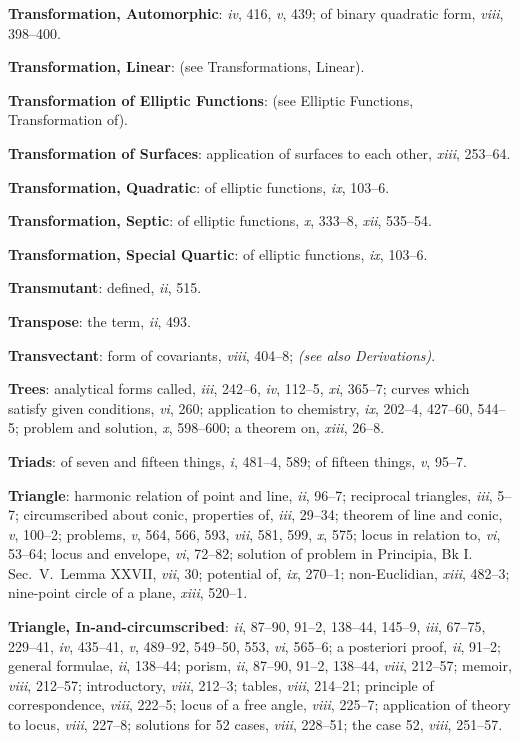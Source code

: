 \documentclass[11pt,a4paper]{article}
\newcommand{\IndexEntry}[1]{\textbf{#1}}
\newcommand{\SeeAlso}[1]{\textit{(see also #1)}}
\newcommand{\V}[1]{\textit{#1}} %
\begin{document}
\IndexEntry{Transformation, Automorphic}: \V{iv}, 416, \V{v}, 439; of binary quadratic form, \V{viii}, 398--400.

\IndexEntry{Transformation, Linear}: (see Transformations, Linear).

\IndexEntry{Transformation of Elliptic Functions}: (see Elliptic Functions, Transformation of).

\IndexEntry{Transformation of Surfaces}: application of surfaces to each other, \V{xiii}, 253--64.

\IndexEntry{Transformation, Quadratic}: of elliptic functions, \V{ix}, 103--6.

\IndexEntry{Transformation, Septic}: of elliptic functions, \V{x}, 333--8, \V{xii}, 535--54.

\IndexEntry{Transformation, Special Quartic}: of elliptic functions, \V{ix}, 103--6.

\newpage

\setcounter{page}{129}

\IndexEntry{Transmutant}: defined, \V{ii}, 515.

\IndexEntry{Transpose}: the term, \V{ii}, 493.

\IndexEntry{Transvectant}: form of covariants, \V{viii}, 404--8; \SeeAlso{Derivations}.

\IndexEntry{Trees}: analytical forms called, \V{iii}, 242--6, \V{iv}, 112--5, \V{xi}, 365--7; curves which satisfy given conditions, \V{vi}, 260; application to chemistry, \V{ix}, 202--4, 427--60, 544--5; problem and solution, \V{x}, 598--600; a theorem on, \V{xiii}, 26--8.

\IndexEntry{Triads}: of seven and fifteen things, \V{i}, 481--4, 589; of fifteen things, \V{v}, 95--7.

\IndexEntry{Triangle}: harmonic relation of point and line, \V{ii}, 96--7; reciprocal triangles, \V{iii}, 5--7; circumscribed about conic, properties of, \V{iii}, 29--34; theorem of line and conic, \V{v}, 100--2; problems, \V{v}, 564, 566, 593, \V{vii}, 581, 599, \V{x}, 575; locus in relation to, \V{vi}, 53--64; locus and envelope, \V{vi}, 72--82; solution of problem in Principia, Bk I. Sec.\ V.\ Lemma XXVII, \V{vii}, 30; potential of, \V{ix}, 270--1; non-Euclidian, \V{xiii}, 482--3; nine-point circle of a plane, \V{xiii}, 520--1.

\IndexEntry{Triangle, In-and-circumscribed}: \V{ii}, 87--90, 91--2, 138--44, 145--9, \V{iii}, 67--75, 229--41, \V{iv}, 435--41, \V{v}, 489--92, 549--50, 553, \V{vi}, 565--6; a posteriori proof, \V{ii}, 91--2; general formulae, \V{ii}, 138--44; porism, \V{ii}, 87--90, 91--2, 138--44, \V{viii}, 212--57; memoir, \V{viii}, 212--57; introductory, \V{viii}, 212--3; tables, \V{viii}, 214--21; principle of correspondence, \V{viii}, 222--5; locus of a free angle, \V{viii}, 225--7; application of theory to locus, \V{viii}, 227--8; solutions for 52 cases, \V{viii}, 228--51; the case 52, \V{viii}, 251--57.
\end{document}
